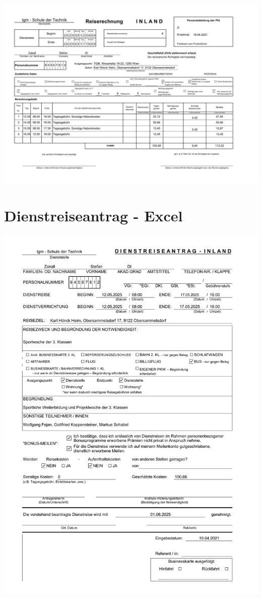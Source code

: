 \begin{center}
	\includegraphics[width=\linewidth]{chapters/appendix/travel_invoice_szakall_excel}
\end{center}


\section*{Dienstreiseantrag - Excel}
{}

%


\begin{center}
	\includegraphics[width=\linewidth]{chapters/appendix/business_trip_application_szakall_excel}
\end{center}
